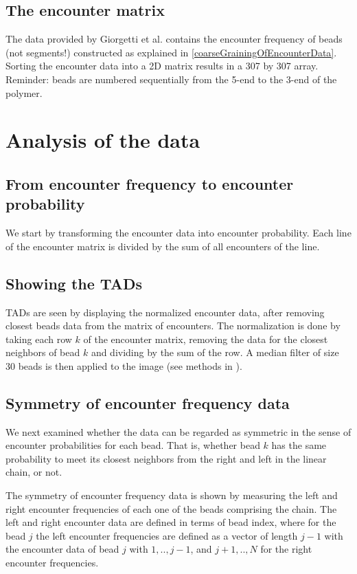\documentclass[12pt]{book}
\begin{document}
\subsection{The encounter matrix}
The data provided by Giorgetti et al.\cite{giorgetti2014predictive} contains the encounter frequency of beads (not segments!) constructed as explained in \ref{coarseGrainingOfEncounterData}. Sorting the encounter data into a 2D matrix results in a 307 by 307 array. Reminder: beads are numbered sequentially from the 5-end to the 3-end of the polymer.

\section{Analysis of the data}

\subsection{From encounter frequency to encounter probability}
We start by transforming the encounter data into encounter probability. Each line of the encounter matrix is divided by the sum of all encounters of the line.

\subsection{Showing the TADs}
TADs are seen by displaying the normalized encounter data, after removing closest beads data from the matrix of encounters. 
The normalization is done by taking each row $k$ of the encounter matrix, removing the data for the closest neighbors of bead $k$ and dividing by the sum of the row. A median filter of size 30 beads is then applied to the image (see methods in \cite{nora2012spatial}). 
 
\subsection{Symmetry of encounter frequency data}
We next examined whether the data can be regarded as symmetric in the sense of encounter probabilities for each bead. That is, whether bead $k$ has the same probability to meet its closest neighbors from the right and left in the linear chain, or not.  

The symmetry of encounter frequency data is shown by measuring the left and right encounter frequencies of each one of the beads comprising the chain.
The left and right encounter data are defined in terms of bead index, where for the bead $j$ the left encounter frequencies are defined as a vector of length $j-1$ with the encounter data of bead $j$ with $1,..,j-1$, and $j+1,..,N$ for the right encounter frequencies. 
\end{document}
